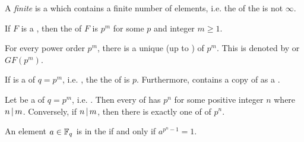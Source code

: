 \begin{definition}\label{def:Polynomial_Ring_Properties-Finite_Field}
  A \emph{finite } is a  which contains a finite number of elements, i.e. the  of the  is not $\infty$.

  \begin{propertylist}
  \item If $F$ is a , then the  of $F$ is $p^{m}$ for some  $p$ and integer $m \geq 1$.\label{prop:Polynomial_Ring_Properties-Order}
  \item For every  power order $p^{m}$, there is a unique (up to )  of  $p^{m}$. This  is denoted by  or $GF \left(p^{m} \right)$.\label{prop:Polynomial_Ring_Properties-Uniqueness}
  \item If  is a  of  $q = p^{m}$, i.e. , the the \emph{} of  is $p$.
    Furthermore,  contains a copy of  as a \emph{}.\label{prop:Polynomial_Ring_Properties-Characteristic}
  \item Let  be a  of  $q = p^{m}$, i.e. .
    Then every  of  has  $p^{n}$ for some positive integer $n$ where $n \operatorname{\vert} m$.
    Conversely, if $n \operatorname{\vert} m$, then there is exactly one  of  of  $p^{n}$.\label{prop:Polynomial_Ring_Properties-Subfield}
  \item An element $a \in \mathbb{F}_{q^{}}$ is in the   if and only if $a^{p^{n} - 1} = 1$.\label{prop:Polynomial_Ring_Properties-Element_in_Subfield}
  \end{propertylist}
\end{definition}

